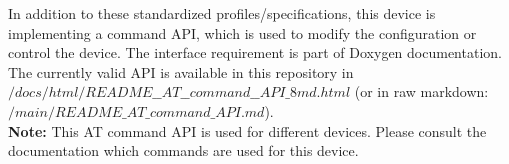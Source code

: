 \documentclass[]{scrreprt}%
\newcommand{\note}[1]{\textcolor{black!50}{\textit{Note: #1}}}
\begin{document}
In addition to these standardized profiles/specifications, this device is implementing a command API, which is used to modify the configuration or control the device. The interface requirement is part of Doxygen documentation. The currently valid API is available in
this repository in \textit{$/docs/html/README\_\_AT\_\_command\_\_API\_8md.html$} (or in raw markdown: \textit{$/main/README\_AT\_command\_API.md$}).\\
\textbf{Note:} This AT command API is used for different devices. Please consult the documentation which commands are used for this device.\\
% 
% 
% 
% 
% 
% 
% 
% 
% 
% 
% 
% 
% 
% 
\end{document}
